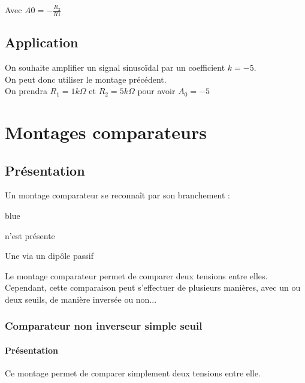 Avec $A0= -\frac{R_2}{R1}$

\section{Application}

\begin{exemple}
On souhaite amplifier un signal sinusoïdal par un coefficient $k=-5$.\\
On peut donc utiliser le montage précédent. \\
On prendra $R_1=1 k\Omega$ et $R_2=5k\Omega$ pour avoir $A_0=-5$

\end{exemple}

\chapter{Montages comparateurs}
\section{Présentation}

Un montage comparateur se reconnaît par son branchement : 

\begin{items}{blue}{\Triangle}
  \item {} n’est présente
  \item Une  via un dipôle passif
\end{items}

Le montage comparateur permet de comparer deux tensions entre elles. \\
Cependant, cette comparaison peut s’effectuer de plusieurs manières, avec un ou deux seuils, de manière inversée ou non...

\subsection{Comparateur non inverseur simple seuil}

\subsubsection{Présentation}

Ce montage permet de comparer simplement deux tensions entre elle.

